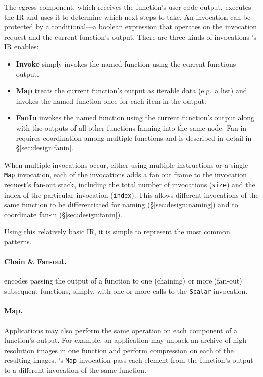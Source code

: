 The egress component, which receives the function's user-code output, executes
the IR and uses it to determine which next steps to take. An invocation can be
protected by a conditional---a boolean expression that operates on the
invocation request and the current function's output. There are three kinds of
invocations \name{}'s IR enables:

\begin{itemize}
  \item \textbf{Invoke} simply invokes the named function using the
        current functions output.
  \item \textbf{Map} treats the current function's output as iterable data
        (e.g.\ a list) and invokes the named function once for each item in the
        output.
  \item \textbf{FanIn} invokes the named function using the current function's
        output along with the outputs of all other functions fanning into the
        same node. Fan-in requires coordination among multiple functions and is
        described in detail in \S\ref{sec:design:fanin}.
\end{itemize}

When multiple invocations occur, either using multiple instructions or a single
\texttt{Map} invocation, each of the invocations adds a fan out frame to the
invocation request's fan-out stack, including the total number of invocations
(\texttt{size}) and the index of the particular invocation (\texttt{index}).
This allows different invocations of the same function to be differentiated for
naming (\S\ref{sec:design:naming}) and to coordinate fan-in
(\S\ref{sec:design:fanin}).


Using this relatively basic IR, it is simple to represent the most common patterns.

\paragraph{Chain \& Fan-out.}
\name{} encodes passing the output of a function to one (chaining) or more
(fan-out) subsequent functions, simply, with one or more calls to the
\texttt{Scalar} invocation.

\paragraph{Map.}
Applications may also perform the same operation on each component of a
function's output. For example, an application may unpack an archive of
high-resolution images in one function and perform compression on each of the
resulting images. \name{}'s \texttt{Map} invocation pass each element from the
function's output to a different invocation of the same function.

